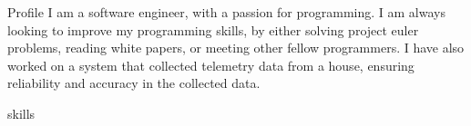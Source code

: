 



\thispagestyle{empty}

  

  \begin{cvsection}{Profile}
    I am a software engineer, with a passion for programming. I am always looking to improve my programming skills, by either solving project euler problems, reading white papers, or meeting other fellow programmers. I have also worked on a system that collected telemetry data from a house, ensuring reliability and accuracy in the collected data.
  \end{cvsection}

  \begin{cvlistssection}{skills}
  \end{cvlistssection}

